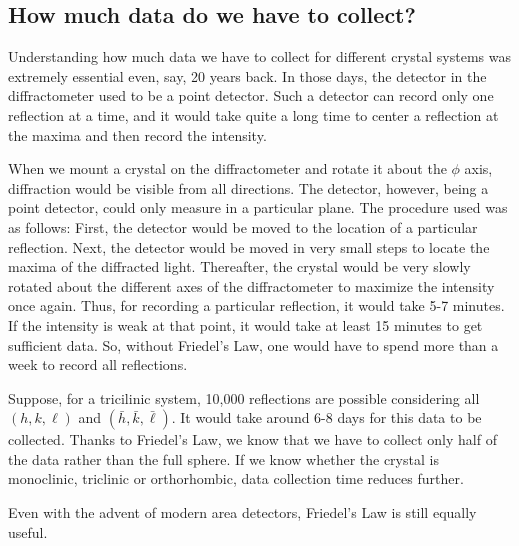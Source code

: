 \subsection{How much data do we have to collect?}

Understanding how much data we have to collect for different crystal systems was extremely essential even, say, 20 years back. In those days, the detector in the diffractometer used to be a point detector. Such a detector can record only one reflection at a time, and it would take quite a long time to center a reflection at the maxima and then record the intensity. 

When we mount a crystal on the diffractometer and rotate it about the $\phi$ axis, diffraction would be visible from all directions. The detector, however, being a point detector, could only measure in a particular plane. The procedure used was as follows: First, the detector would be moved to the location of a particular reflection. Next, the detector would be moved in very small steps to locate the maxima of the diffracted light. Thereafter, the crystal would be very slowly rotated about the different axes of the diffractometer to maximize the intensity once again. Thus, for recording a particular reflection, it would take 5-7 minutes. If the intensity is weak at that point, it would take at least 15 minutes to get sufficient data. So, without Friedel's Law, one would have to spend more than a week to record all reflections.

Suppose, for a tricilinic system, 10,000 reflections are possible considering all $(h,k,\ell)$ and $(\bar{h}, \bar{k}, \bar{\ell}).$ It would take around 6-8 days for this data to be collected. Thanks to Friedel's Law, we know that we have to collect only half of the data rather than the full sphere. If we know whether the crystal is monoclinic, triclinic or orthorhombic, data collection time reduces further.

Even with the advent of modern area detectors, Friedel's Law is still equally useful.